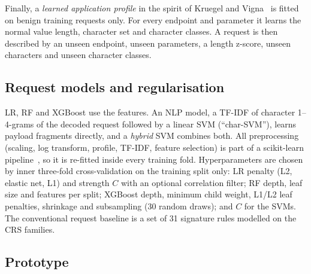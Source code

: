 \documentclass[conference]{IEEEtran}
\begin{document}
Finally, a \emph{learned application profile} in the spirit of Kruegel and Vigna~\cite{kruegel2003} is fitted on benign training requests only. For every endpoint and parameter it learns the normal value length, character set and character classes. A request is then described by an unseen endpoint, unseen parameters, a length z-score, unseen characters and unseen character classes.


\subsection{Request models and regularisation}

LR, RF and XGBoost use the features. An NLP model, a TF-IDF of character 1--4-grams of the decoded request followed by a linear SVM (``char-SVM''), learns payload fragments directly, and a \emph{hybrid} SVM combines both. All preprocessing (scaling, log transform, profile, TF-IDF, feature selection) is part of a scikit-learn pipeline~\cite{sklearn}, so it is re-fitted inside every training fold. Hyperparameters are chosen by inner three-fold cross-validation on the training split only: LR penalty (L2, elastic net, L1) and strength $C$ with an optional correlation filter; RF depth, leaf size and features per split; XGBoost depth, minimum child weight, L1/L2 leaf penalties, shrinkage and subsampling (30 random draws); and $C$ for the SVMs. The conventional request baseline is a set of 31 signature rules modelled on the CRS families.

\subsection{Prototype}

\end{document}
